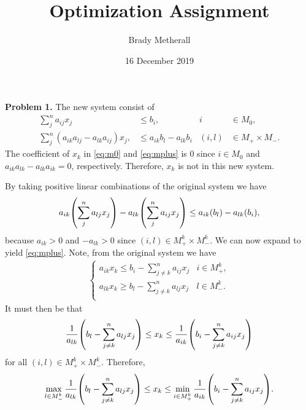 \documentclass[11pt,a4paper]{article}
\title{Optimization Assignment}
\author{Brady Metherall}
\date{16 December 2019}
\let\originalleft\left
\let\originalright\right
\renewcommand{\left}{\mathopen{}\mathclose\bgroup\originalleft}
\renewcommand{\right}{\aftergroup\egroup\originalright}
\begin{document}
\maketitle


\textbf{Problem 1.}
The new system consist of
\begin{align}
	\sum_j^n a_{ij} x_j &\leq b_i, & i &\in M_0, \label{eq:m0} \\
	\sum_j^n (a_{ik} a_{lj} - a_{lk} a_{ij}) x_j, &\leq a_{ik} b_l - a_{lk} b_i & (i,l) &\in M_+ \times M_-. \label{eq:mplus}
\end{align}
The coefficient of $x_k$ in \eqref{eq:m0} and \eqref{eq:mplus} is 0 since $i \in M_0$ and $a_{ik} a_{lk} - a_{lk} a_{ik} = 0$, respectively. Therefore, $x_k$ is not in this new system.

By taking positive linear combinations of the original system we have
\begin{align*}
	a_{ik} \left( \sum_j^n a_{lj} x_j \right) - a_{lk} \left( \sum_j^n a_{ij} x_j \right) \leq a_{ik} \left( b_l \right) - a_{lk} \left( b_i \right),
\end{align*}
because $a_{ik} > 0$ and $-a_{lk} > 0$ since $(i, l) \in M_+^k \times M_-^k$. We can now expand to yield \eqref{eq:mplus}. Note, from the original system we have
\begin{align*}
	\begin{cases}
		\displaystyle a_{ik} x_k \leq b_i - \sum_{j \neq k}^n a_{ij} x_j & i \in M_+^k, \\
		\displaystyle a_{lk} x_k \geq b_l - \sum_{j \neq k}^n a_{lj} x_j & l \in M_-^k. \\
	\end{cases}
\end{align*}
It must then be that
\begin{align*}
	\frac{1}{a_{lk}} \left( b_l - \sum_{j \neq k}^n a_{lj} x_j \right) \leq x_k \leq \frac{1}{a_{ik}} \left( b_i - \sum_{j \neq k}^n a_{ij} x_j \right)
\end{align*}
for all $(i, l) \in M_+^k \times M_-^k$. Therefore,
\begin{align*}
	\max_{l \in M_-^k} \frac{1}{a_{lk}} \left( b_l - \sum_{j \neq k}^n a_{lj} x_j \right) \leq x_k \leq \min_{i \in M_+^k} \frac{1}{a_{ik}} \left( b_i - \sum_{j \neq k}^n a_{ij} x_j \right).
\end{align*}
\end{document}
